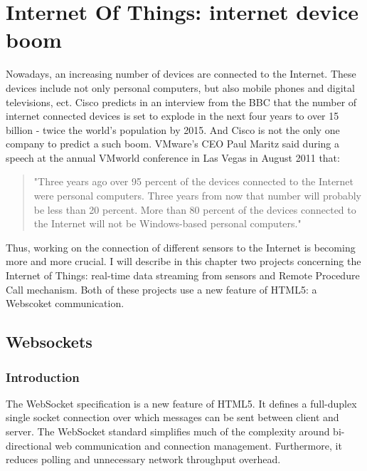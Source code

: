\documentclass[pdftex,12pt,a4paper]{report}
\begin{document}
\chapter{Internet Of Things: internet device boom}
Nowadays, an increasing number of devices are connected to the Internet. These devices include not only personal computers, but also mobile phones and digital televisions, ect.
Cisco predicts in an interview from the BBC that the number of internet connected devices is set to explode in the next four years to over 15 billion - twice the world's population by 2015. And Cisco is not the only one company to predict a such boom. VMware's CEO Paul Maritz said during a speech at the annual VMworld conference in Las Vegas in August 2011 that:

\begin{quote} "Three years ago over 95 percent of the devices connected to the Internet were personal computers. Three years from now that number will probably be less than 20 percent. More than 80 percent of the devices connected to the Internet will not be Windows-based personal computers." \\
\end{quote}

Thus, working on the connection of different sensors to the Internet is becoming more and more crucial. I will describe in this chapter two projects concerning the Internet of Things: real-time data streaming from sensors and Remote Procedure Call mechanism. Both of these projects use a new feature of HTML5: a Webscoket communication.

\section{Websockets}
\subsection{Introduction}
The WebSocket specification is a new feature of HTML5. It defines a full-duplex single socket connection over which messages can be sent between client and server. The WebSocket standard simplifies much of the complexity around bi-directional web communication and connection management. Furthermore, it reduces polling and unnecessary network throughput overhead. 
\end{document}
